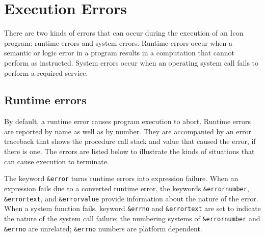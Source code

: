 \section{Execution Errors}

There are two kinds of errors that can occur during the execution of an
Icon program: runtime errors and system errors. Runtime errors occur
when a semantic or logic error in a program results in a computation
that cannot perform as instructed. System errors occur when an
operating system call fails to perform a
required service.

\subsection*{Runtime errors}

By default, a runtime error causes program
execution to abort. Runtime errors are reported by name as well as by
number. They are accompanied by an error traceback that shows the
procedure call stack and value that caused the error, if there is one.
The errors are listed below to illustrate the kinds of situations that
can cause execution to terminate.

The keyword \texttt{\&error} turns runtime errors into
expression failure. When an expression fails due to a converted runtime
error, the keywords \texttt{\&errornumber}, \texttt{\&errortext}, and
\texttt{\&errorvalue} provide information about the nature of the
error. When a system function fails, keyword \texttt{\&errno} and
\texttt{\&errortext} are set to indicate the nature of the
system call failure; the numbering systems of \texttt{\&errornumber}
and \texttt{\&errno} are unrelated; \texttt{\&errno} numbers are
platform dependent.

